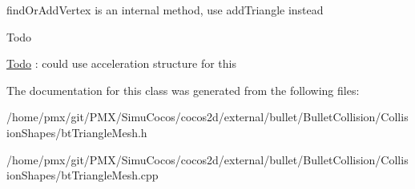 find\+Or\+Add\+Vertex is an internal method, use add\+Triangle instead 

\begin{DoxyRefDesc}{Todo}
\item[\hyperlink{todo__todo000024}{Todo}]\+: could use acceleration structure for this \end{DoxyRefDesc}


The documentation for this class was generated from the following files\+:\begin{DoxyCompactItemize}
\item 
/home/pmx/git/\+P\+M\+X/\+Simu\+Cocos/cocos2d/external/bullet/\+Bullet\+Collision/\+Collision\+Shapes/bt\+Triangle\+Mesh.\+h\item 
/home/pmx/git/\+P\+M\+X/\+Simu\+Cocos/cocos2d/external/bullet/\+Bullet\+Collision/\+Collision\+Shapes/bt\+Triangle\+Mesh.\+cpp\end{DoxyCompactItemize}
